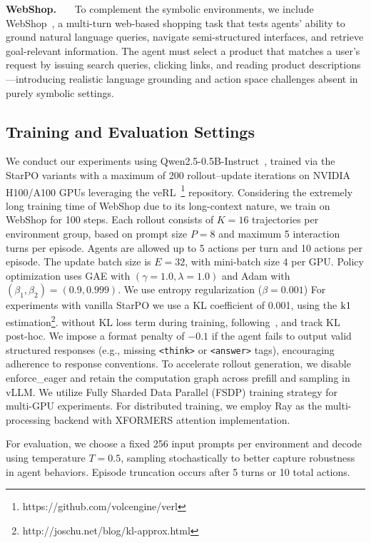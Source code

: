 \noindent\textbf{WebShop.}~~~
To complement the symbolic environments, we include WebShop~\cite{yao2022webshop}, a multi-turn web-based shopping task that tests agents' ability to ground natural language queries, navigate semi-structured interfaces, and retrieve goal-relevant information. The agent must select a product that matches a user’s request by issuing search queries, clicking links, and reading product descriptions—introducing realistic language grounding and action space challenges absent in purely symbolic settings.


\subsection{Training and Evaluation Settings}
\label{app:train-eval-setting}
We conduct our experiments using Qwen2.5-0.5B-Instruct~\citep{qwen2.5}, trained via the StarPO variants with a maximum of 200 rollout–update iterations on NVIDIA H100/A100 GPUs leveraging the veRL~\footnote{https://github.com/volcengine/verl} repository. Considering the extremely long training time of WebShop due to its long-context nature, we train on WebShop for 100 steps. Each rollout consists of $K=16$ trajectories per environment group, based on prompt size $P=8$ and maximum 5 interaction turns per episode. Agents are allowed up to 5 actions per turn and 10 actions per episode. The update batch size is $E=32$, with mini-batch size 4 per GPU. Policy optimization uses GAE with $(\gamma=1.0, \lambda=1.0)$ and Adam with $(\beta_1, \beta_2) = (0.9, 0.999)$.
We use entropy regularization ($\beta=0.001$) For experiments with vanilla StarPO we use a KL coefficient of 0.001, using the $\rm k1$ estimation\footnote{http://joschu.net/blog/kl-approx.html}. without KL loss term during training, following~\citep{yu2025DAPO}, and track KL post-hoc. We impose a format penalty of $-0.1$ if the agent fails to output valid structured responses (e.g., missing \texttt{<think>} or \texttt{<answer>} tags), encouraging adherence to response conventions. To accelerate rollout generation, we disable enforce\_eager and retain the computation graph across prefill and sampling in vLLM. We utilize Fully Sharded Data Parallel (FSDP) training strategy for multi-GPU experiments. For distributed training, we employ Ray as the multi-processing backend with XFORMERS attention implementation.

For evaluation, we choose a fixed 256 input prompts per environment and decode using temperature $T{=}0.5$, sampling stochastically to better capture robustness in agent behaviors. Episode truncation occurs after 5 turns or 10 total actions. 


